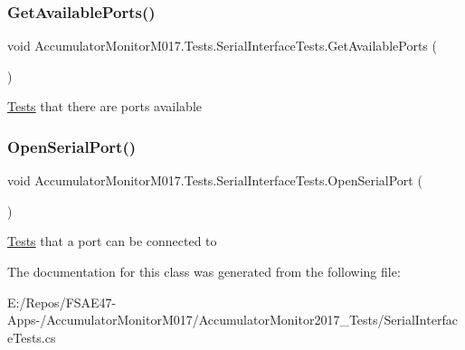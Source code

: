 \subsubsection{\texorpdfstring{Get\+Available\+Ports()}{GetAvailablePorts()}}
{\footnotesize\ttfamily void Accumulator\+Monitor\+M017.\+Tests.\+Serial\+Interface\+Tests.\+Get\+Available\+Ports (\begin{DoxyParamCaption}{ }\end{DoxyParamCaption})\hspace{0.3cm}{\ttfamily [inline]}}



\hyperlink{namespace_accumulator_monitor_m017_1_1_tests}{Tests} that there are ports available 

\mbox{\label{class_accumulator_monitor_m017_1_1_tests_1_1_serial_interface_tests_a118111302f955310dcc503306bf43cfd}} 
\subsubsection{\texorpdfstring{Open\+Serial\+Port()}{OpenSerialPort()}}
{\footnotesize\ttfamily void Accumulator\+Monitor\+M017.\+Tests.\+Serial\+Interface\+Tests.\+Open\+Serial\+Port (\begin{DoxyParamCaption}{ }\end{DoxyParamCaption})\hspace{0.3cm}{\ttfamily [inline]}}



\hyperlink{namespace_accumulator_monitor_m017_1_1_tests}{Tests} that a port can be connected to 



The documentation for this class was generated from the following file\+:\begin{DoxyCompactItemize}
\item 
E\+:/\+Repos/\+F\+S\+A\+E47-\/\+Apps-\//\+Accumulator\+Monitor\+M017/\+Accumulator\+Monitor2017\+\_\+\+Tests/Serial\+Interface\+Tests.\+cs\end{DoxyCompactItemize}
